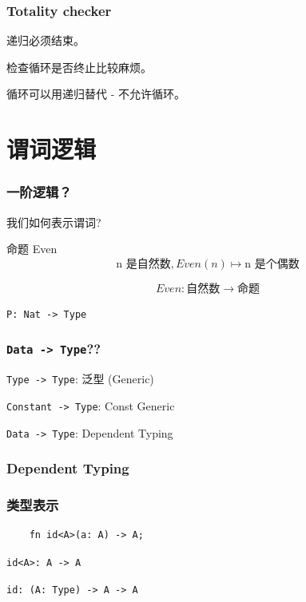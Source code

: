 \documentclass[UTF-8]{ctexbeamer}
\begin{document}
\begin{frame}
  \frametitle{Totality checker}

  递归必须结束。

  \pause

  \vspace{1em}

  检查循环是否终止比较麻烦。
  
  \pause
  
  循环可以用递归替代 - 不允许循环。
\end{frame}

\section{谓词逻辑}

\begin{frame}
  \frametitle{一阶逻辑？}

  我们如何表示谓词?

  \begin{block}{命题 Even}
    $$
    \text{n 是自然数}, Even(n) \mapsto \text{n 是个偶数}
    $$

    \pause
    \vspace{0.5em}

    $$
    Even: \text{自然数} \rightarrow \text{命题}
    $$

    \pause
    \vspace{0.5em}

    \begin{center}
      \texttt{P: Nat -> Type}
    \end{center}
  \end{block}
\end{frame}

\begin{frame}
  \frametitle{\texttt{Data -> Type}??}

  \pause

  \texttt{Type -> Type}: 泛型 (Generic)

  \pause

  \texttt{Constant -> Type}: Const Generic

  \pause

  \texttt{Data -> Type}: Dependent Typing
\end{frame}

\begin{frame}
  \frametitle{Dependent Typing}
\end{frame}

\begin{frame}[fragile]
  \frametitle{类型表示}

  \begin{verbatim}
    fn id<A>(a: A) -> A;
  \end{verbatim}

  \pause

  \begin{center}
    \texttt{id<A>: A -> A}

    \pause
    \vspace{1em}

    \texttt{id: (A: Type) -> A -> A}
  \end{center}
\end{frame}
\end{document}
